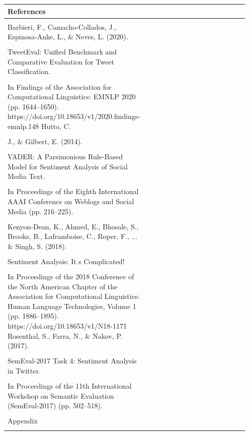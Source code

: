 \documentclass[11pt]{article}
\begin{document}
\begin{longtable}{|p{0.55\linewidth}|p{0.40\linewidth}|}
\hline
References & \\[2pt]
\hline
\rule{0pt}{3.5cm} & \\
\hline
Barbieri, F., Camacho-Collados, J., Espinosa-Anke, L., \& Neves, L. (2020). & \\[2pt]
\hline
\rule{0pt}{3.5cm} & \\
\hline
TweetEval: Unified Benchmark and Comparative Evaluation for Tweet Classification. & \\[2pt]
\hline
\rule{0pt}{3.5cm} & \\
\hline
In Findings of the Association for Computational Linguistics: EMNLP 2020 (pp. 1644--1650). https://doi.org/10.18653/v1/2020.findings-emnlp.148 Hutto, C. & \\[2pt]
\hline
\rule{0pt}{3.5cm} & \\
\hline
J., \& Gilbert, E. (2014). & \\[2pt]
\hline
\rule{0pt}{3.5cm} & \\
\hline
VADER: A Parsimonious Rule-Based Model for Sentiment Analysis of Social Media Text. & \\[2pt]
\hline
\rule{0pt}{3.5cm} & \\
\hline
In Proceedings of the Eighth International AAAI Conference on Weblogs and Social Media (pp. 216--225). & \\[2pt]
\hline
\rule{0pt}{3.5cm} & \\
\hline
Kenyon-Dean, K., Ahmed, E., Bhosale, S., Brooks, B., Laframboise, C., Roper, F., ... \& Singh, S. (2018). & \\[2pt]
\hline
\rule{0pt}{3.5cm} & \\
\hline
Sentiment Analysis: It s Complicated! & \\[2pt]
\hline
\rule{0pt}{3.5cm} & \\
\hline
In Proceedings of the 2018 Conference of the North American Chapter of the Association for Computational Linguistics: Human Language Technologies, Volume 1 (pp. 1886--1895). https://doi.org/10.18653/v1/N18-1171 Rosenthal, S., Farra, N., \& Nakov, P. (2017). & \\[2pt]
\hline
\rule{0pt}{3.5cm} & \\
\hline
SemEval-2017 Task 4: Sentiment Analysis in Twitter. & \\[2pt]
\hline
\rule{0pt}{3.5cm} & \\
\hline
In Proceedings of the 11th International Workshop on Semantic Evaluation (SemEval-2017) (pp. 502--518). & \\[2pt]
\hline
\rule{0pt}{3.5cm} & \\
\hline
Appendix & \\[2pt]
\hline
\rule{0pt}{3.5cm} & \\
\hline
\end{longtable}
\end{document}
